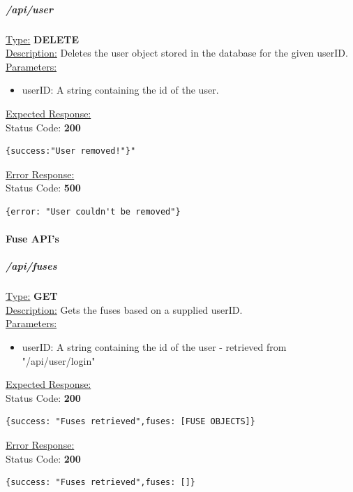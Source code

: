 \documentclass[draft,preprint,12pt,3p]{elsarticle}
\newcommand{\forceindent}{\leavevmode{\parindent=1em\indent}}
\begin{document}
\subparagraph*{/api/user}
\underline{Type:} \textbf{DELETE}\\

\underline{Description:} Deletes the user object stored in the database for the given userID.\\

\underline{Parameters:}
\begin{itemize}
\item userID: A string containing the id of the user.
\end{itemize}

\underline{Expected Response:}\\[5pt]
\forceindent Status Code: \textbf{200} \\
\begin{verbatim}
{success:"User removed!"}"
\end{verbatim}
\underline{Error Response:}\\[5pt]
\forceindent Status Code: \textbf{500} \\
\begin{verbatim}
{error: "User couldn't be removed"}
\end{verbatim}



\paragraph{Fuse API's}
\subparagraph*{/api/fuses}
\underline{Type:} \textbf{GET}\\

\underline{Description:} Gets the fuses based on a supplied userID.\\

\underline{Parameters:}
\begin{itemize}
\item userID: A string containing the id of the user - retrieved from "/api/user/login"
\end{itemize}
\underline{Expected Response:}\\[5pt]
\forceindent Status Code: \textbf{200} \\
\begin{verbatim}
{success: "Fuses retrieved",fuses: [FUSE OBJECTS]}
\end{verbatim}
\underline{Error Response:}\\[5pt]
\forceindent Status Code: \textbf{200} \\
\begin{verbatim}
{success: "Fuses retrieved",fuses: []}
\end{verbatim}
\end{document}
